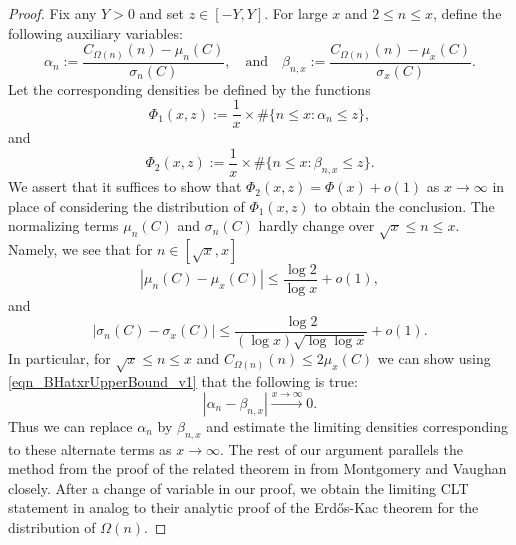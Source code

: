 \documentclass[11pt,reqno,a4letter]{article}
\numberwithin{figure}{section}
\numberwithin{table}{section}
\theoremstyle{plain}
\numberwithin{theorem}{section}
\theoremstyle{definition}
\begin{document}
\begin{proof} 
Fix any $Y > 0$ and set $z \in [-Y, Y]$. 
For large $x$ and $2 \leq n \leq x$, define the following auxiliary variables: 
\[
\alpha_n := \frac{C_{\Omega(n)}(n) - \mu_n(C)}{\sigma_n(C)}, \quad\mathrm{and}\quad 
     \beta_{n,x} := \frac{C_{\Omega(n)}(n) - \mu_x(C)}{\sigma_x(C)}. 
\] 
Let the corresponding densities be defined by the functions 
\[
\Phi_1(x, z) := \frac{1}{x} \times \#\{n \leq x: \alpha_n \leq z\}, 
\]
and 
\[
\Phi_2(x, z) := \frac{1}{x} \times \#\{n \leq x: \beta_{n,x} \leq z\}. 
\] 
We assert that it suffices to show that $\Phi_2(x, z) = \Phi(x) + o(1)$ as 
$x \rightarrow \infty$ in place of considering the distribution of 
$\Phi_1(x, z)$ to obtain the conclusion. 
The normalizing terms $\mu_n(C)$ and $\sigma_n(C)$ hardly change over 
$\sqrt{x} \leq n \leq x$. Namely, we see that for $n \in [\sqrt{x}, x]$
\[
|\mu_n(C) - \mu_x(C)| \leq 
     \frac{\log 2}{\log x} + o(1), 
\]
and 
\[
|\sigma_n(C) - \sigma_x(C)| 
     \leq \frac{\log 2}{(\log x) \sqrt{\log\log x}} + o(1). 
\]
In particular, for 
$\sqrt{x} \leq n \leq x$ and $C_{\Omega(n)}(n) \leq 2 \mu_x(C)$ we can show 
using \eqref{eqn_BHatxrUpperBound_v1} 
that the following is true: 
\[
|\alpha_n - \beta_{n,x}| \xrightarrow{x \rightarrow \infty} 0. 
\]
Thus we can replace $\alpha_n$ by $\beta_{n,x}$ and estimate the limiting 
densities corresponding to these alternate terms as $x \rightarrow \infty$. 
The rest of our argument parallels the method from the proof of the related theorem in 
\cite[Thm.\ 7.21; \S 7.4]{MV} from Montgomery and Vaughan closely. 
After a change of variable in our proof, we obtain the limiting 
CLT statement in analog to their analytic proof of the Erd\H{o}s-Kac theorem 
for the distribution of $\Omega(n)$. 


\end{proof}
\end{document}
